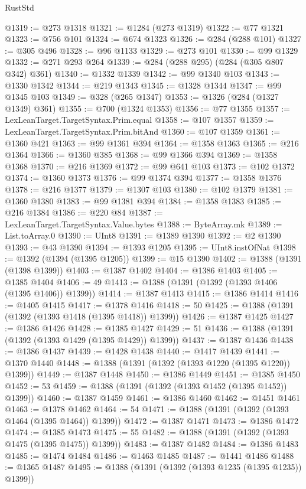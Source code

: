 \begin{lexlean}{RustStd}
\begin{coremodule}
@1319 := @273 @1318
@1321 := @1284 (@273 @1319)
@1322 := @77 @1321
@1323 := @756 @101
@1324 := @674 @1323
@1326 := @284 (@288 @101)
@1327 := @305 @496
@1328 := @96 @1133
@1329 := @273 @101
@1330 := @99 @1329
@1332 := @271 @293 @264
@1339 := @284 (@288 @295) (@284 (@305 @807 @342) @361)
@1340 := @1332 @1339
@1342 := @99 @1340 @103
@1343 := @1330 @1342
@1344 := @219 @1343
@1345 := @1328 @1344
@1347 := @99 @1345 @103
@1349 := @328 (@265 @1347)
@1353 := @1326 (@284 (@1327 @1349) @361)
@1355 := @700 (@1324 @1353)
@1356 := @77 @1355
@1357 := LexLeanTarget.TargetSyntax.Prim.equal
@1358 := @107 @1357
@1359 := LexLeanTarget.TargetSyntax.Prim.bitAnd
@1360 := @107 @1359
@1361 := @1360 @421
@1363 := @99 @1361 @394
@1364 := @1358 @1363
@1365 := @216 @1364
@1366 := @1360 @385
@1368 := @99 @1366 @394
@1369 := @1358 @1368
@1370 := @216 @1369
@1372 := @99 @641 @103
@1373 := @102 @1372
@1374 := @1360 @1373
@1376 := @99 @1374 @394
@1377 := @1358 @1376
@1378 := @216 @1377
@1379 := @1307 @103
@1380 := @102 @1379
@1381 := @1360 @1380
@1383 := @99 @1381 @394
@1384 := @1358 @1383
@1385 := @216 @1384
@1386 := @220 @84
@1387 := LexLeanTarget.TargetSyntax.Value.bytes
@1388 := ByteArray.mk
@1389 := List.toArray.{0}
@1390 := UInt8
@1391 := @1389 @1390
@1392 := @2 @1390
@1393 := @43 @1390
@1394 := @1393 @1205
@1395 := UInt8.instOfNat
@1398 := @1392 (@1394 (@1395 @1205))
@1399 := @15 @1390
@1402 := @1388 (@1391 (@1398 @1399))
@1403 := @1387 @1402
@1404 := @1386 @1403
@1405 := @1385 @1404
@1406 := 49
@1413 := @1388 (@1391 (@1392 (@1393 @1406 (@1395 @1406)) @1399))
@1414 := @1387 @1413
@1415 := @1386 @1414
@1416 := @1405 @1415
@1417 := @1378 @1416
@1418 := 50
@1425 := @1388 (@1391 (@1392 (@1393 @1418 (@1395 @1418)) @1399))
@1426 := @1387 @1425
@1427 := @1386 @1426
@1428 := @1385 @1427
@1429 := 51
@1436 := @1388 (@1391 (@1392 (@1393 @1429 (@1395 @1429)) @1399))
@1437 := @1387 @1436
@1438 := @1386 @1437
@1439 := @1428 @1438
@1440 := @1417 @1439
@1441 := @1370 @1440
@1448 := @1388 (@1391 (@1392 (@1393 @1220 (@1395 @1220)) @1399))
@1449 := @1387 @1448
@1450 := @1386 @1449
@1451 := @1385 @1450
@1452 := 53
@1459 := @1388 (@1391 (@1392 (@1393 @1452 (@1395 @1452)) @1399))
@1460 := @1387 @1459
@1461 := @1386 @1460
@1462 := @1451 @1461
@1463 := @1378 @1462
@1464 := 54
@1471 := @1388 (@1391 (@1392 (@1393 @1464 (@1395 @1464)) @1399))
@1472 := @1387 @1471
@1473 := @1386 @1472
@1474 := @1385 @1473
@1475 := 55
@1482 := @1388 (@1391 (@1392 (@1393 @1475 (@1395 @1475)) @1399))
@1483 := @1387 @1482
@1484 := @1386 @1483
@1485 := @1474 @1484
@1486 := @1463 @1485
@1487 := @1441 @1486
@1488 := @1365 @1487
@1495 := @1388 (@1391 (@1392 (@1393 @1235 (@1395 @1235)) @1399))

\end{coremodule}
\end{lexlean}
